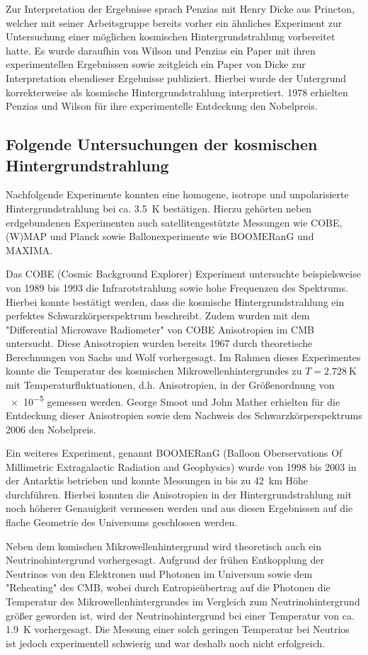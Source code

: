 Zur Interpretation der Ergebnisse sprach Penzias mit Henry Dicke aus Princton, welcher mit seiner Arbeitsgruppe bereits vorher ein ähnliches Experiment zur Untersuchung einer möglichen kosmischen Hintergrundstrahlung vorbereitet hatte.
Es wurde daraufhin von Wilson und Penzias ein Paper mit ihren experimentellen Ergebnissen sowie zeitgleich ein Paper von Dicke zur Interpretation ebendieser Ergebnisse publiziert.
Hierbei wurde der Untergrund korrekterweise als kosmische Hintergrundstrahlung interpretiert.
1978 erhielten Penzias und Wilson für ihre experimentelle Entdeckung den Nobelpreis.

\subsection{Folgende Untersuchungen der kosmischen Hintergrundstrahlung}

Nachfolgende Experimente konnten eine homogene, isotrope und unpolarisierte Hintergrundstrahlung bei ca. \SI{3.5}{\kelvin} bestätigen.
Hierzu gehörten neben erdgebundenen Experimenten auch satellitengestützte Messungen wie COBE, (W)MAP und Planck sowie Ballonexperimente wie BOOMERanG und MAXIMA.

Das COBE (Cosmic Background Explorer) Experiment untersuchte beispielsweise von 1989 bis 1993 die Infrarotstrahlung sowie hohe Frequenzen des Spektrums.
Hierbei konnte bestätigt werden, dass die kosmische Hintergrundstrahlung ein perfektes Schwarzkörperspektrum beschreibt.
Zudem wurden mit dem "Differential Microwave Radiometer" von COBE Anisotropien im CMB untersucht. 
Diese Anisotropien wurden bereits 1967 durch theoretische Berechnungen von Sachs und Wolf vorhergesagt.
Im Rahmen dieses Experimentes konnte die Temperatur des kosmischen Mikrowellenhintergrundes zu $T = \SI{2.728}{\kelvin}$ mit Temperaturfluktuationen, d.h. Anisotropien, in der Größenordnung von \num{e-5} gemessen werden.
George Smoot und John Mather erhielten für die Entdeckung dieser Anisotropien sowie dem Nachweis des Schwarzkörperspektrums 2006 den Nobelpreis.

Ein weiteres Experiment, genannt BOOMERanG (Balloon Oberservations Of Millimetric Extragalactic Radiation and Geophysics) wurde von 1998 bis 2003 in der Antarktis betrieben und konnte Messungen in bis zu \SI{42}{\kilo\metre} Höhe durchführen.
Hierbei konnten die Anisotropien in der Hintergrundstrahlung mit noch höherer Genauigkeit vermessen werden und aus diesen Ergebnissen auf die flache Geometrie des Universums geschlossen werden.

Neben dem komischen Mikrowellenhintergrund wird theoretisch auch ein Neutrinohintergrund vorhergesagt. Aufgrund der frühen Entkopplung der Neutrinos von den Elektronen und Photonen im Universum sowie dem "Reheating" des CMB, wobei durch Entropieübertrag auf die Photonen die Temperatur des Mikrowellenhintergrundes im Vergleich zum Neutrinohintergrund größer geworden ist, wird der Neutrinohintergrund bei einer Temperatur von ca. \SI{1.9}{\kelvin} vorhergesagt.
Die Messung einer solch geringen Temperatur bei Neutrios ist jedoch experimentell schwierig und war deshalb noch nicht erfolgreich.